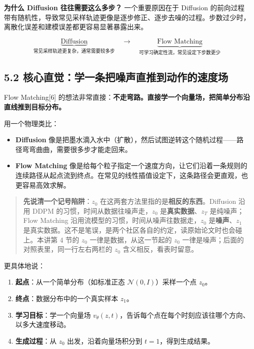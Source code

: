 \documentclass[
  chinese,
]{ctexart}
\providecommand{\tightlist}{%
  \setlength{\itemsep}{0pt}\setlength{\parskip}{0pt}}
\begin{document}
\textbf{为什么 Diffusion 往往需要这么多步？} 一个重要原因在于 Diffusion
的前向过程带有随机性，导致常见采样轨迹更像是逐步修正、逐步去噪的过程。步数过少时，离散化误差和建模误差都更容易显著暴露出来。

\[
\underbrace{\text{Diffusion}}_{\text{常见采样轨迹更复杂，通常需要较多步}} \quad\longrightarrow\quad \underbrace{\text{Flow Matching}}_{\text{可学习确定性流，常见设定下步数更少}}
\]

\subsection{5.2
核心直觉：学一条把噪声直推到动作的速度场}\label{ux6838ux5fc3ux76f4ux89c9ux5b66ux4e00ux6761ux628aux566aux58f0ux76f4ux63a8ux5230ux52a8ux4f5cux7684ux901fux5ea6ux573a}

Flow Matching{[}6{]}
的想法非常直接：\textbf{不走弯路。直接学一个向量场，把简单分布沿直线推到目标分布。}

用一个物理类比：

\begin{itemize}
\tightlist
\item
  \textbf{Diffusion}
  像是把墨水滴入水中（扩散），然后试图逆转这个随机过程------路径弯弯曲曲，需要很多步才能走回来。
\item
  \textbf{Flow Matching}
  像是给每个粒子指定一个速度方向，让它们沿着一条规则的连续路径从起点流到终点。在常见的线性插值设定下，这条路径会更直观，也更容易高效求解。
\end{itemize}

\begin{quote}
\textbf{先说清一个记号陷阱}：\(z_0\)
在这两套方法里指的是\textbf{相反的东西}。Diffusion 沿用 DDPM
的习惯，时间从数据往噪声走，\(z_0\) 是\textbf{真实数据}、\(z_T\)
是纯噪声；Flow Matching 沿用流模型的习惯，时间从噪声往数据走，\(z_0\)
是\textbf{噪声}、\(z_1\)
是真实数据。这不是笔误，是两个社区各自的约定，读原始论文时也会碰上。本讲第
4 节的 \(z_0\) 一律是数据，从这一节起的 \(z_0\)
一律是噪声；后面的对照表里，同一行左右两栏的 \(z_0\)
含义相反，看表时留意。
\end{quote}

更具体地说：

\begin{enumerate}
\def\labelenumi{\arabic{enumi}.}
\tightlist
\item
  \textbf{起点}：从一个简单分布（如标准正态
  \(\mathcal{N}(0, I)\)）采样一个点 \(z_0\)。
\item
  \textbf{终点}：数据分布中的一个真实样本 \(z_1\)。
\item
  \textbf{学习目标}：学一个向量场
  \(v_\theta(z, t)\)，告诉每个点在每个时刻应该往哪个方向、以多大速度移动。
\item
  \textbf{生成过程}：从 \(z_0\) 出发，沿着向量场积分到
  \(t=1\)，得到生成结果。
\end{enumerate}
\end{document}
